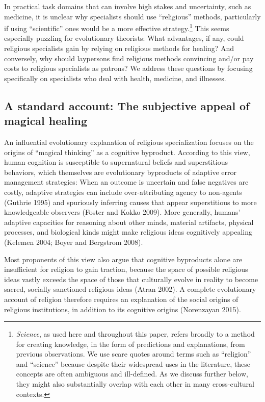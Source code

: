 \documentclass[
  11pt,
]{article}
\begin{document}
In practical task domains that can involve high stakes and uncertainty, such as medicine, it is unclear why specialists should use ``religious'' methods, particularly if using ``scientific'' ones would be a more effective strategy.\footnote{\emph{Science}, as used here and throughout this paper, refers broadly to a method for creating knowledge, in the form of predictions and explanations, from previous observations. We use scare quotes around terms such as “religion” and “science” because despite their widespread uses in the literature, these concepts are often ambiguous and ill-defined. As we discuss further below, they might also substantially overlap with each other in many cross-cultural contexts.} This seems especially puzzling for evolutionary theorists: What advantages, if any, could religious specialists gain by relying on religious methods for healing? And conversely, why should laypersons find religious methods convincing and/or pay costs to religious specialists as patrons? We address these questions by focusing specifically on specialists who deal with health, medicine, and illnesses.

\hypertarget{a-standard-account-the-subjective-appeal-of-magical-healing}{%
\subsection{A standard account: The subjective appeal of magical healing}\label{a-standard-account-the-subjective-appeal-of-magical-healing}}

An influential evolutionary explanation of religious specialization focuses on the origins of ``magical thinking'' as a cognitive byproduct. According to this view, human cognition is susceptible to supernatural beliefs and superstitious behaviors, which themselves are evolutionary byproducts of adaptive error management strategies: When an outcome is uncertain and false negatives are costly, adaptive strategies can include over-attributing agency to non-agents (Guthrie 1995) and spuriously inferring causes that appear superstitious to more knowledgeable observers (Foster and Kokko 2009). More generally, humans' adaptive capacities for reasoning about other minds, material artifacts, physical processes, and biological kinds might make religious ideas cognitively appealing (Kelemen 2004; Boyer and Bergstrom 2008).

Most proponents of this view also argue that cognitive byproducts alone are insufficient for religion to gain traction, because the space of possible religious ideas vastly exceeds the space of those that culturally evolve in reality to become sacred, socially sanctioned religious ideas (Atran 2002). A complete evolutionary account of religion therefore requires an explanation of the social origins of religious institutions, in addition to its cognitive origins (Norenzayan 2015).
\end{document}
